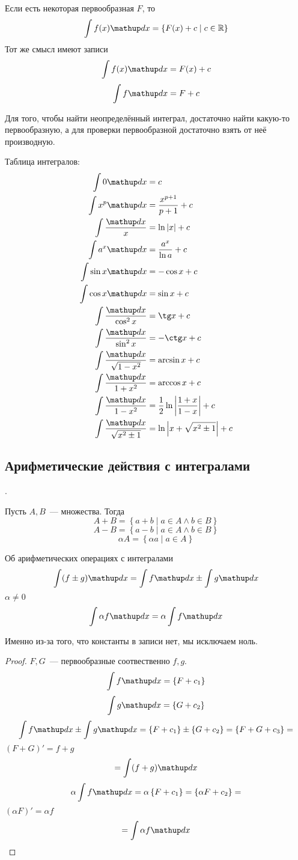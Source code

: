 Если есть некоторая первообразная $F$, то
$$\int f(x)\d x = \left\{F(x) + c \mid c \in \R\right\}$$
Тот же смысл имеют записи
$$\int f(x)\d x = F(x) + c$$
$$\int f\d x = F + c$$

Для того, чтобы найти неопределённый интеграл, достаточно найти какую-то первообразную, а для проверки первообразной достаточно взять от неё производную.

Таблица интегралов:
\begin{align*}
\int 0\d x &= c \\
\int x^p\d x &= \frac{x^{p+1}}{p + 1} + c \\
\int \frac{\d x}{x} &= \ln |x| + c \\
\int a^x \d x &= \frac{a^x}{\ln a} + c \\
\int \sin x \d x &= -\cos x + c \\
\int \cos x \d x &= \sin x + c \\
\int \frac{\d x}{\cos^2 x} &= \tg x + c \\
\int \frac{\d x}{\sin^2 x} &= -\ctg x + c \\
\int \frac{\d x}{\sqrt{1 - x^2}} &= \arcsin x + c \\
\int \frac{\d x}{1 + x^2} &= \arccos x + c \\
\int \frac{\d x}{1 - x^2} &= \frac12 \ln \left|\frac{1+x}{1-x}\right| + c\\
\int \frac{\d x}{\sqrt{x^2 \pm 1}} &= \ln \left|x + \sqrt{x^2 \pm 1}\right| + c
\end{align*}

\subsection{Арифметические действия с интегралами}.

\begin{Def}
Пусть $A, B$~--- множества. Тогда
$$A + B = \left\{a + b \mid a \in A \land b \in B\right\}$$
$$A - B = \left\{a - b \mid a \in A \land b \in B\right\}$$
$$\alpha A = \left\{\alpha a \mid a \in A\right\}$$
\end{Def}

\begin{theorem}{Об арифметических операциях с интегралами}
$$\int (f \pm g) \d x = \int f \d x \pm \int g \d x$$
$\alpha \ne 0$
$$\int \alpha f \d x = \alpha \int f \d x$$
\end{theorem}
\begin{Rem}
Именно из-за того, что константы в записи нет, мы исключаем ноль.
\end{Rem}
\begin{proof}
$F, G$~--- первообразные соотвественно $f, g$.
$$\int f \d x = \left\{F + c_1\right\}$$
$$\int g \d x = \left\{G + c_2\right\}$$
$$\int f \d x \pm \int g \d x = \left\{F + c_1\right\} \pm \left\{G + c_2\right\} = \left\{F+G+c_3\right\} = $$
$(F+G)' = f + g$
$$ = \int (f+g)\d x$$
$$\alpha \int f \d x = \alpha \left\{F + c_1\right\} = \left\{\alpha F + c_2\right\} = $$
$(\alpha F)' = \alpha f$
$$ = \int \alpha f\d x$$
\end{proof}

